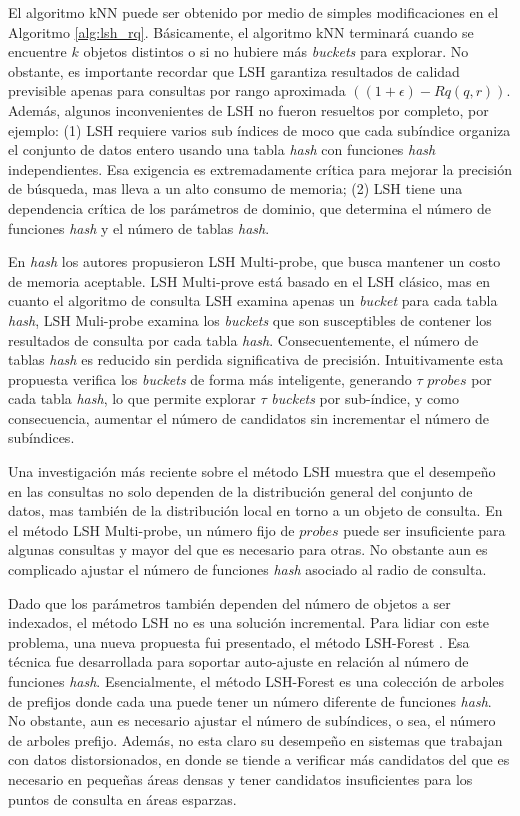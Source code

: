El algoritmo kNN puede ser obtenido por medio de simples modificaciones en el Algoritmo \ref{alg:lsh_rq}. Básicamente, el algoritmo kNN terminará cuando se encuentre $k$ objetos distintos o si no hubiere más \textit{buckets} para explorar. No obstante, es importante recordar que LSH garantiza resultados de calidad previsible apenas para consultas por rango aproximada $((1+\epsilon)-Rq(q, r))$. Además, algunos inconvenientes de LSH no fueron resueltos por completo, por ejemplo: (1) LSH requiere varios sub índices de moco que cada subíndice organiza el conjunto de datos entero usando una tabla \textit{hash} con funciones \textit{hash} independientes. Esa exigencia es extremadamente crítica para mejorar la precisión de búsqueda, mas lleva a un alto consumo de memoria; (2) LSH tiene una dependencia crítica de los parámetros de dominio, que determina el número de funciones \textit{hash} y el número de tablas \textit{hash}.


 En \textit{hash} los autores propusieron LSH Multi-probe, que busca mantener un costo de memoria aceptable. LSH Multi-prove está basado en el LSH clásico, mas en cuanto el algoritmo de consulta LSH examina apenas un \textit{bucket} para cada tabla \textit{hash}, LSH Muli-probe examina los \textit{buckets} que son susceptibles de contener los resultados de consulta por cada tabla \textit{hash}. Consecuentemente, el número de tablas \textit{hash} es reducido sin perdida significativa de precisión. Intuitivamente esta propuesta verifica los \textit{buckets} de forma más inteligente, generando $\tau$ $probes$ por cada tabla   \textit{hash}, lo que permite explorar $\tau$ \textit{buckets} por sub-índice, y como consecuencia, aumentar el número de candidatos sin incrementar el número de subíndices.

Una investigación más reciente sobre el método LSH \cite{modelinglsh}  muestra que el desempeño en las consultas no solo dependen de la distribución general del conjunto de datos, mas también de la distribución local en torno a un objeto de consulta. En el método LSH Multi-probe, un número fijo de $probes$ puede ser insuficiente para algunas consultas y mayor del que es necesario para otras. No obstante aun es complicado ajustar el número de funciones \textit{hash} asociado al radio de consulta.

Dado que los parámetros también dependen del número de objetos a ser indexados, el método LSH no es una solución incremental. Para lidiar con este problema, una nueva propuesta fui presentado, el método LSH-Forest \cite{lshforest}. Esa técnica fue desarrollada para soportar auto-ajuste en relación al número de funciones \textit{hash}. Esencialmente, el método LSH-Forest es una colección de arboles de prefijos donde cada una puede tener un número diferente de funciones \textit{hash}. No obstante, aun es necesario ajustar el número de subíndices, o sea, el número de arboles prefijo. Además, no esta claro su desempeño en sistemas que trabajan con datos distorsionados, en donde se tiende a verificar más candidatos del que es necesario en pequeñas áreas densas y tener candidatos insuficientes para los puntos de consulta en áreas esparzas.


